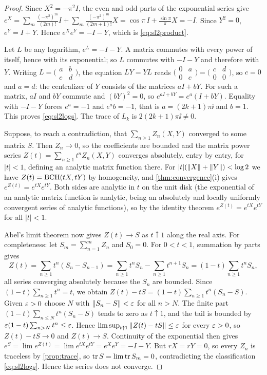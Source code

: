 \begin{proof}
Since $X^2=-\pi^2I$, the even and odd parts of the exponential series give
$e^X=\sum_m\frac{(-\pi^2)^m}{(2m)!}I+\sum_m\frac{(-\pi^2)^m}{(2m+1)!}X
=\cos\pi\,I+\frac{\sin\pi}{\pi}X=-I$. Since $Y^2=0$, $e^Y=I+Y$. Hence
$e^Xe^Y=-I-Y$, which is \eqref{eq:sl2product}.

Let $L$ be any logarithm, $e^L=-I-Y$. A matrix commutes with every power of
itself, hence with its exponential; so $L$ commutes with $-I-Y$ and
therefore with $Y$. Writing $L=\bigl(\begin{smallmatrix}a&b\\c&d\end{smallmatrix}\bigr)$,
the equation $LY=YL$ reads
$\bigl(\begin{smallmatrix}0&a\\0&c\end{smallmatrix}\bigr)
=\bigl(\begin{smallmatrix}c&d\\0&0\end{smallmatrix}\bigr)$, so $c=0$ and
$a=d$: the centralizer of $Y$ consists of the matrices $aI+bY$. For such a
matrix, $aI$ and $bY$ commute and $(bY)^2=0$, so
$e^{aI+bY}=e^a(I+bY)$. Equality with $-I-Y$ forces $e^a=-1$ and $e^ab=-1$,
that is $a=(2k+1)\pi\ii$ and $b=1$. This proves \eqref{eq:sl2logs}. The
trace of $L_k$ is $2(2k+1)\pi\ii\neq0$.

Suppose, to reach a contradiction, that $\sum_{n\geq1}Z_n(X,Y)$ converged to
some matrix $S$. Then $Z_n\to0$, so the coefficients are bounded and the
matrix power series $Z(t)=\sum_{n\geq1}t^nZ_n(X,Y)$ converges absolutely,
entry by entry, for $|t|<1$, defining an analytic matrix function there. For
$|t|(\left\lVert X\right\rVert+\left\lVert Y\right\rVert)<\log2$ we have $Z(t)=\operatorname{BCH}(tX,tY)$ by homogeneity, and
\cref{thm:convergence}(i) gives $e^{Z(t)}=e^{tX}e^{tY}$. Both sides are
analytic in $t$ on the unit disk (the exponential of an analytic matrix
function is analytic, being an absolutely and locally uniformly convergent
series of analytic functions), so by the identity theorem
$e^{Z(t)}=e^{tX}e^{tY}$ for all $|t|<1$.

Abel's limit theorem now gives $Z(t)\to S$ as $t\uparrow1$ along the real
axis. For completeness: let $S_m=\sum_{n=1}^mZ_n$ and $S_0=0$. For $0<t<1$,
summation by parts gives
\[
 Z(t)=\sum_{n\geq1}t^n(S_n-S_{n-1})=\sum_{n\geq1}t^nS_n-\sum_{n\geq1}t^{n+1}S_n
 =(1-t)\sum_{n\geq1}t^nS_n,
\]
all series converging absolutely because the $S_n$ are bounded. Since
$(1-t)\sum_{n\geq1}t^n=t$, we obtain
$Z(t)-tS=(1-t)\sum_{n\geq1}t^n(S_n-S)$. Given $\varepsilon>0$ choose $N$ with
$\left\lVert S_n-S\right\rVert<\varepsilon$ for all $n>N$. The finite part
$(1-t)\sum_{n\leq N}t^n(S_n-S)$ tends to zero as $t\uparrow1$, and the tail
is bounded by $\varepsilon(1-t)\sum_{n>N}t^n\leq\varepsilon$. Hence
$\limsup_{t\uparrow1}\left\lVert Z(t)-tS\right\rVert\leq\varepsilon$ for every $\varepsilon>0$, so
$Z(t)-tS\to0$ and $Z(t)\to S$. Continuity of the exponential then gives $e^S=\lim e^{Z(t)}
=\lim e^{tX}e^{tY}=e^Xe^Y=-I-Y$. But $	r X=	r Y=0$, so every $Z_n$ is traceless by
\cref{prop:trace}, so $\operatorname{tr} S=\lim\operatorname{tr} S_m=0$, contradicting the
classification \eqref{eq:sl2logs}. Hence the series does not converge.
\end{proof}
